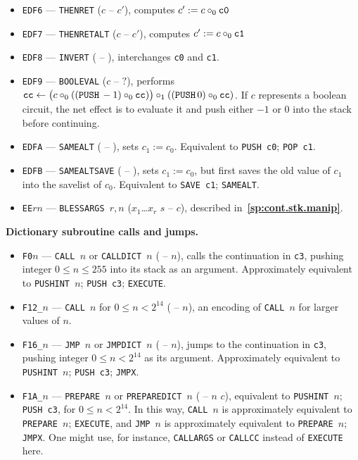 \documentclass[12pt,oneside]{article}
\def\makepoint#1{\medbreak\noindent{\bf #1.\ }}
\def\nxsubpoint{\refstepcounter{subsubsection}%
  \smallbreak\makepoint{\thesubsubsection}}
\def\refpoint#1{{\rm\textbf{\ref{#1}}}}
\let\ptref=\refpoint
\def\emb#1{\textbf{#1.}}
\begin{document}
\begin{itemize}
\item {\tt EDF6} --- {\tt THENRET} ($c$ -- $c'$), computes $c':=c\circ_0{\tt c0}$
\item {\tt EDF7} --- {\tt THENRETALT} ($c$ -- $c'$), computes $c':=c\circ_0{\tt c1}$
\item {\tt EDF8} --- {\tt INVERT} ( -- ), interchanges {\tt c0} and {\tt c1}.
\item {\tt EDF9} --- {\tt BOOLEVAL} ($c$ -- $?$), performs ${\tt cc}\leftarrow \bigl(c\circ_0(({\tt PUSH}\,-1)\circ_0{\tt cc})\bigr)\circ_1(({\tt PUSH}\,0)\circ_0{\tt cc})$. If $c$ represents a boolean circuit, the net effect is to evaluate it and push either $-1$ or $0$ into the stack before continuing.
\item {\tt EDFA} --- {\tt SAMEALT} ( -- ), sets $c_1:=c_0$. Equivalent to {\tt PUSH c0}; {\tt POP c1}.
\item {\tt EDFB} --- {\tt SAMEALTSAVE} ( -- ), sets $c_1:=c_0$, but first saves the old value of $c_1$ into the savelist of $c_0$. Equivalent to {\tt SAVE c1}; {\tt SAMEALT}.
\item {\tt EE$rn$} --- {\tt BLESSARGS $r,n$} ($x_1$\dots$x_r$ $s$ -- $c$), described in~\ptref{sp:cont.stk.manip}.
\end{itemize}

\nxsubpoint\emb{Dictionary subroutine calls and jumps}\label{sp:prim.dict.calls}
\begin{itemize}
\item {\tt F0$n$} --- {\tt CALL $n$} or {\tt CALLDICT $n$} ( -- $n$), calls the continuation in {\tt c3}, pushing integer $0\leq n\leq 255$ into its stack as an argument. Approximately equivalent to {\tt PUSHINT $n$}; {\tt PUSH c3}; {\tt EXECUTE}.
\item {\tt F12\_$n$} --- {\tt CALL $n$} for $0\leq n<2^{14}$ ( -- $n$), an encoding of {\tt CALL $n$} for larger values of $n$.
\item {\tt F16\_$n$} --- {\tt JMP $n$} or {\tt JMPDICT $n$} ( -- $n$), jumps to the continuation in {\tt c3}, pushing integer $0\leq n<2^{14}$ as its argument. Approximately equivalent to {\tt PUSHINT $n$}; {\tt PUSH c3}; {\tt JMPX}.
\item {\tt F1A\_$n$} --- {\tt PREPARE $n$} or {\tt PREPAREDICT $n$} ( -- $n$ $c$), equivalent to {\tt PUSHINT $n$}; {\tt PUSH c3}, for $0\leq n<2^{14}$. In this way, {\tt CALL $n$} is approximately equivalent to {\tt PREPARE $n$}; {\tt EXECUTE}, and {\tt JMP $n$} is approximately equivalent to {\tt PREPARE $n$}; {\tt JMPX}. One might use, for instance, {\tt CALLARGS} or {\tt CALLCC} instead of {\tt EXECUTE} here.
\end{itemize}
\end{document}
